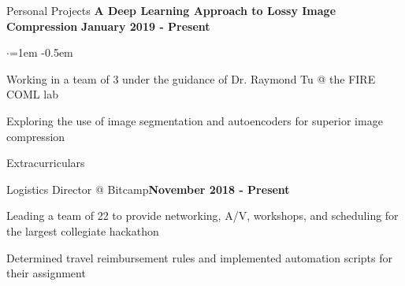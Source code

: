 \documentclass[margin,centered]{resume} %
\begin{document}
\begin{rSection}{Personal Projects}
{\bf A Deep Learning Approach to Lossy Image Compression} \hfill {\bf January 2019 - Present}
 \begin{list}{$\cdot$}{\leftmargin=1em} %
   \itemsep -0.5em \vspace{-0.5em} %
		\item Working in a team of 3 under the guidance of Dr. Raymond Tu @ the FIRE COML lab
		\item Exploring the use of image segmentation and autoencoders for superior image compression
  \end{list}

\end{rSection}



\begin{rSection}{Extracurriculars} 

	\begin{rSubsection}{Logistics Director @ Bitcamp}{\textbf{November 2018 - Present}}{}{}
		\item Leading a team of 22 to provide networking, A/V, workshops, and scheduling for the largest collegiate hackathon
		\item Determined travel reimbursement rules and implemented automation scripts for their assignment
	\end{rSubsection}

\end{rSection}
\end{document}

